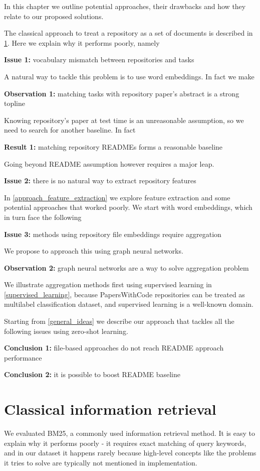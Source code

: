 \documentclass[11pt]{report}
\begin{document}
In this chapter we outline potential approaches, their drawbacks and how they
relate to our proposed solutions.

The classical approach to treat a repository as a set of documents is described in
\ref{classical_ir}. Here we explain why it performs poorly, namely

\textbf{Issue 1:} vocabulary mismatch between repositories and tasks

A natural way to tackle this problem is to use word embeddings. In fact we make

\textbf{Observation 1:} matching tasks with repository paper's abstract is a strong topline 

Knowing repository's paper at test time is an unreasonable assumption, so we
need to search for another baseline. In fact

\textbf{Result 1:} matching repository READMEs forms a reasonable baseline

Going beyond README assumption however requires a major leap. 

\textbf{Issue 2:} there is no natural way to extract repository features 

In \ref{approach_feature_extraction} we explore feature extraction and
some potential approaches that worked poorly. We start with word
embeddings, which in turn face the following

\textbf{Issue 3:} methods using repository file embeddings require aggregation

We propose to approach this using graph neural networks.

\textbf{Observation 2:} graph neural networks are a way to solve aggregation problem

We illustrate aggregation methods first using supervised learning in \ref{supervised_learning}, because PapersWithCode
repositories can be treated as multilabel classification dataset, and supervised
learning is a well-known domain.

Starting from \ref{general_ideas} we describe our approach that tackles all
the following issues using zero-shot learning.

\textbf{Conclusion 1:} file-based approaches do not reach README approach performance

\textbf{Conclusion 2:} it is possible to boost README baseline

\section{Classical information retrieval}
\label{classical_ir}
We evaluated BM25, a commonly used information retrieval method. It is easy to
explain why it performs poorly - it requires exact matching of query keywords,
and in our dataset it happens rarely because high-level concepts like the
problems it tries to solve are typically not mentioned in implementation.
\end{document}
